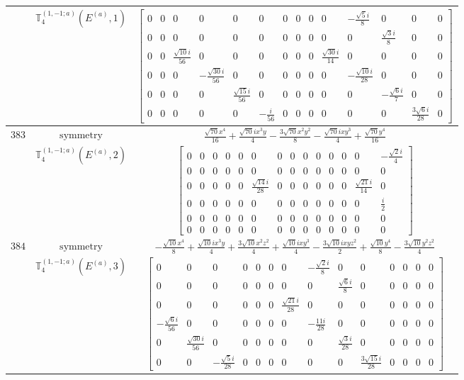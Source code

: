 \documentclass[fleqn,8pt,landscape]{jsarticle}
\begin{document}
\begin{longtable}{ccc}
$  $ & $ \mathbb{T}_{4}^{(1,-1;a)}(E^{(a)},1) $ & $ \begin{bmatrix} 0 & 0 & 0 & 0 & 0 & 0 & 0 & 0 & 0 & 0 & - \frac{\sqrt{5} i}{8} & 0 & 0 & 0 \\ 0 & 0 & 0 & 0 & 0 & 0 & 0 & 0 & 0 & 0 & 0 & \frac{\sqrt{3} i}{8} & 0 & 0 \\ 0 & 0 & \frac{\sqrt{10} i}{56} & 0 & 0 & 0 & 0 & 0 & 0 & \frac{\sqrt{30} i}{14} & 0 & 0 & 0 & 0 \\ 0 & 0 & 0 & - \frac{\sqrt{30} i}{56} & 0 & 0 & 0 & 0 & 0 & 0 & - \frac{\sqrt{10} i}{28} & 0 & 0 & 0 \\ 0 & 0 & 0 & 0 & \frac{\sqrt{15} i}{56} & 0 & 0 & 0 & 0 & 0 & 0 & - \frac{\sqrt{6} i}{7} & 0 & 0 \\ 0 & 0 & 0 & 0 & 0 & - \frac{i}{56} & 0 & 0 & 0 & 0 & 0 & 0 & \frac{3 \sqrt{6} i}{28} & 0 \end{bmatrix} $ \\ \hline
$ 383 $ & $ \text{symmetry} $ & $ \frac{\sqrt{70} x^{4}}{16} + \frac{\sqrt{70} i x^{3} y}{4} - \frac{3 \sqrt{70} x^{2} y^{2}}{8} - \frac{\sqrt{70} i x y^{3}}{4} + \frac{\sqrt{70} y^{4}}{16} $ \\
$  $ & $ \mathbb{T}_{4}^{(1,-1;a)}(E^{(a)},2) $ & $ \begin{bmatrix} 0 & 0 & 0 & 0 & 0 & 0 & 0 & 0 & 0 & 0 & 0 & 0 & 0 & - \frac{\sqrt{2} i}{4} \\ 0 & 0 & 0 & 0 & 0 & 0 & 0 & 0 & 0 & 0 & 0 & 0 & 0 & 0 \\ 0 & 0 & 0 & 0 & 0 & \frac{\sqrt{14} i}{28} & 0 & 0 & 0 & 0 & 0 & 0 & \frac{\sqrt{21} i}{14} & 0 \\ 0 & 0 & 0 & 0 & 0 & 0 & 0 & 0 & 0 & 0 & 0 & 0 & 0 & \frac{i}{2} \\ 0 & 0 & 0 & 0 & 0 & 0 & 0 & 0 & 0 & 0 & 0 & 0 & 0 & 0 \\ 0 & 0 & 0 & 0 & 0 & 0 & 0 & 0 & 0 & 0 & 0 & 0 & 0 & 0 \end{bmatrix} $ \\ \hline
$ 384 $ & $ \text{symmetry} $ & $ - \frac{\sqrt{10} x^{4}}{8} + \frac{\sqrt{10} i x^{3} y}{4} + \frac{3 \sqrt{10} x^{2} z^{2}}{4} + \frac{\sqrt{10} i x y^{3}}{4} - \frac{3 \sqrt{10} i x y z^{2}}{2} + \frac{\sqrt{10} y^{4}}{8} - \frac{3 \sqrt{10} y^{2} z^{2}}{4} $ \\
$  $ & $ \mathbb{T}_{4}^{(1,-1;a)}(E^{(a)},3) $ & $ \begin{bmatrix} 0 & 0 & 0 & 0 & 0 & 0 & 0 & - \frac{\sqrt{2} i}{8} & 0 & 0 & 0 & 0 & 0 & 0 \\ 0 & 0 & 0 & 0 & 0 & 0 & 0 & 0 & \frac{\sqrt{6} i}{8} & 0 & 0 & 0 & 0 & 0 \\ 0 & 0 & 0 & 0 & 0 & 0 & \frac{\sqrt{21} i}{28} & 0 & 0 & 0 & 0 & 0 & 0 & 0 \\ - \frac{\sqrt{6} i}{56} & 0 & 0 & 0 & 0 & 0 & 0 & - \frac{11 i}{28} & 0 & 0 & 0 & 0 & 0 & 0 \\ 0 & \frac{\sqrt{30} i}{56} & 0 & 0 & 0 & 0 & 0 & 0 & \frac{\sqrt{3} i}{28} & 0 & 0 & 0 & 0 & 0 \\ 0 & 0 & - \frac{\sqrt{5} i}{28} & 0 & 0 & 0 & 0 & 0 & 0 & \frac{3 \sqrt{15} i}{28} & 0 & 0 & 0 & 0 \end{bmatrix} $ \\ \hline

\end{longtable}
\end{document}
